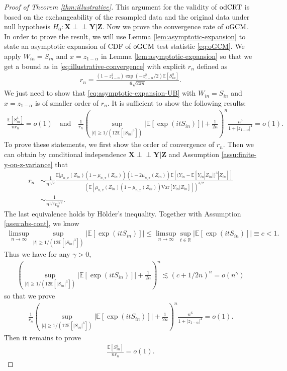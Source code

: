 \documentclass[12pt]{article}
\theoremstyle{definition}
\newcommand{\indep}{\perp \!\!\! \perp}
\newcommand{\E}{\mathbb E}								%
\newcommand{\prx}{\bm X}								%
\newcommand{\prz}{\bm Z}								%
\newcommand{\srz}{Z}									%
\newcommand{\pry}{{\bm Y}}								%
\newcommand{\sry}{Y}									%
\newcommand{\odCRT}{\textnormal{odCRT}} 					%
\newcommand{\oGCM}{\textnormal{oGCM}}						%
\begin{document}
\begin{proof}[Proof of Theorem \ref{thm:illustrative}]
  This argument for the validity of $\odCRT$ is based on the exchangeability of the resampled data and the original data under null hypothesis $H_0:\prx\indep\pry|\prz$. Now we prove the convergence rate of $\oGCM$. In order to prove the result, we will use Lemma \ref{lem:asymptotic-expansion} to state an asymptotic expansion of CDF of $\oGCM$ test statistic \eqref{eq:oGCM}. We apply $W_{in}=S_{in}$ and $x=z_{1-\alpha}$ in Lemma \ref{lem:asymptotic-expansion} so that we get a bound as in \eqref{eq:illustrative-convergence} with explicit $r_n$ defined as 
  \begin{align*}
	r_n=\frac{(1-z_{1-\alpha}^2)\exp(-z_{1-\alpha}^2/2)\E[S_{in}^3]}{6\sqrt{2\pi n}}.
  \end{align*}
  We just need to show that \eqref{eq:asymptotic-expansion-UB} with $W_{in}=S_{in}$ and $x=z_{1-\alpha}$ is of smaller order of $r_n$. It is sufficient to show the following results:
  \begin{align*}
	\frac{\E[S_{in}^4]}{nr_n}=o(1)\quad\text{and}\quad \frac{1}{r_n}\left(\sup_{|t|\geq 1/ (12\E[|S_{in}|^3])}|\E[\exp(itS_{in})]|+\frac{1}{2n}\right)^n\frac{n^6}{1+|z_{1-\alpha}|^4}=o(1).
  \end{align*}
  To prove these statements, we first show the order of convergence of $r_n$. Then we can obtain by conditional independence $\prx\indep\pry|\prz$ and Assumption \ref{assu:finite-y-on-z-variance} that
  \begin{align*}
	r_n
	&
	\sim \frac{1}{n^{1/2}}\frac{\E[\mu_{n,x}(\srz_{in})(1-\mu_{n,x}(\srz_{in}))(1-2\mu_{n,x}(\srz_{in}))\E[(\sry_{in}-\E[\sry_{in}|\srz_{in}])^3|\srz_{in}]]}{(\E[\mu_{n,x}(\srz_{in})(1-\mu_{n,x}(\srz_{in}))\mathrm{Var}[\sry_{in}|\srz_{in}]])^{3/2}}\\
	&
	\sim \frac{1}{n^{1/2}v_n^{1/2}}.
  \end{align*} 
  The last equivalence holds by H\"older's inequality. Together with Assumption \ref{assu:abs-cont}, we know
  \begin{align*}
	\limsup_{n\rightarrow\infty}\sup_{|t|\geq 1/ (12\E[|S_{in}|^3])}|\E[\exp(itS_{in})]|\leq \limsup_{n\rightarrow\infty}\sup_{t\in\mathbb{R}}  |\E[\exp(itS_{in})]|\equiv c<1.
  \end{align*} 
  Thus we have for any $\gamma>0$,
  \begin{align*}
	\left(\sup_{|t|\geq 1/ (12\E[|S_{in}|^3])}|\E[\exp(itS_{in})]|+\frac{1}{2n}\right)^n\lesssim (c+1/2n)^n=o(n^{\gamma})
  \end{align*}
  so that we prove 
  \begin{align*}
	\frac{1}{r_n}\left(\sup_{|t|\geq 1/ (12\E[|S_{in}|^3])}|\E[\exp(itS_{in})]|+\frac{1}{2n}\right)^n\frac{n^6}{1+|z_{1-\alpha}|^4}=o(1).
  \end{align*}
  Then it remains to prove
  \begin{align}\label{eq:upper-bounded-expansion}
	\frac{\E[S_{in}^4]}{nr_n}=o(1). 
  \end{align}

\end{proof}
\end{document}
